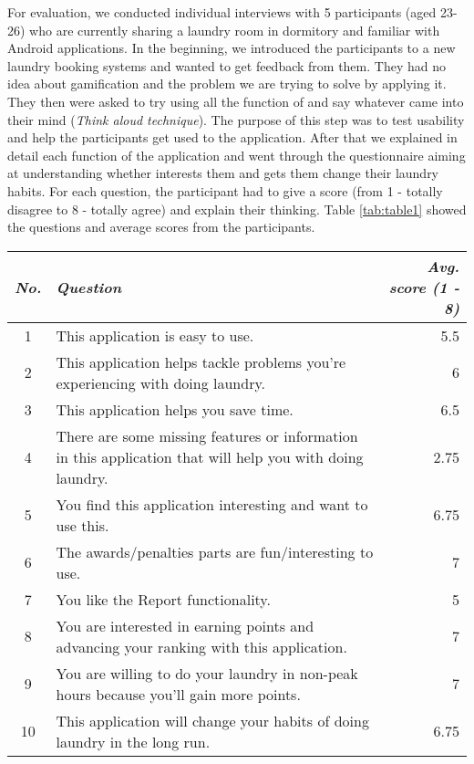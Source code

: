For evaluation, we conducted individual interviews with 5 participants (aged 23-26) who are currently sharing a laundry room in dormitory and familiar with Android applications. In the beginning, we introduced the participants to a new laundry booking systems and wanted to get feedback from them. They had no idea about gamification and the problem we are trying to solve by applying it. They then were asked to try using all the function of {\toolname} and say whatever came into their mind (\emph{Think aloud technique}). The purpose of this step was to test usability and help the participants get used to the application. After that we explained in detail each function of the application and went through the questionnaire aiming at understanding whether {\toolname} interests them and gets them change their laundry habits. For each question, the participant had to give a score (from 1 - totally disagree to 8 - totally agree) and explain their thinking. Table \ref{tab:table1} showed the questions and average scores from the participants.
\begin{table*}
  \centering
  \begin{tabular}{c|l|r}
     {\textit{No.}} &{\textit{Question}} & {\textit{Avg. score (1 - 8)}} \\
    \midrule
    1&This application is easy to use. & 5.5 \\
    2&This application helps tackle problems you’re experiencing with doing laundry. & 6 \\
    3&This application helps you save time. & 6.5\\
    4&There are some missing features or information in this application that will help you with doing laundry. & 2.75 \\
    \midrule
		5&You find this application interesting and want to use this. & 6.75\\
		6&The awards/penalties parts are fun/interesting to use. & 7\\
		7&You like the Report functionality. & 5\\
		8&You are interested in earning points and advancing your ranking with this application. & 7\\
		\midrule
		9&You are willing to do your laundry in non-peak hours because you'll gain more points. & 7\\
		10&This application will change your habits of doing laundry in the long run. & 6.75
  \end{tabular}
  \caption{Questions and average score from the participants.}~\label{tab:table1}
\end{table*}
